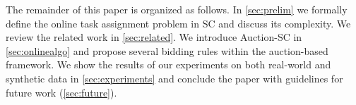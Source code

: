 
The remainder of this paper is organized as follows. In \cref{sec:prelim} we formally define the online task assignment problem in SC and discuss its complexity. We review the related work in \cref{sec:related}. We introduce Auction-SC in \cref{sec:onlinealgo} and propose several bidding rules within the auction-based framework. We show the results of our experiments on both real-world and synthetic data in \cref{sec:experiments} and conclude the paper with guidelines for future work (\cref{sec:future}).